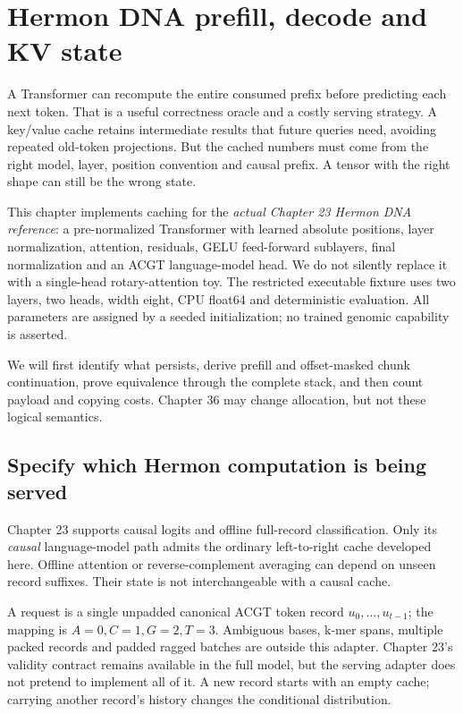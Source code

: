 \chapter{Hermon DNA prefill, decode and KV state}
\label{evod35:chapter}

A Transformer can recompute the entire consumed prefix before predicting
each next token. That is a useful correctness oracle and a costly serving
strategy. A key/value cache retains intermediate results that future queries
need, avoiding repeated old-token projections. But the cached numbers must
come from the right model, layer, position convention and causal prefix.
A tensor with the right shape can still be the wrong state.

This chapter implements caching for the \emph{actual Chapter 23 Hermon DNA
reference}: a pre-normalized Transformer with learned
absolute positions, layer normalization, attention, residuals, GELU
feed-forward sublayers, final normalization and an ACGT language-model head.
We do not silently replace it with a single-head rotary-attention toy.
The restricted executable fixture uses two layers, two heads, width eight,
CPU float64 and deterministic evaluation. All parameters are assigned by a
seeded initialization; no trained genomic capability is asserted.

We will first identify what persists, derive prefill and offset-masked chunk
continuation, prove equivalence through the complete stack, and then count
payload and copying costs. Chapter 36 may change allocation, but not these
logical semantics.

\section{Specify which Hermon computation is being served}
\label{evod35:scope}
Chapter 23 supports causal logits and offline full-record classification.
Only its \emph{causal} language-model path admits the ordinary left-to-right
cache developed here. Offline attention or reverse-complement averaging can
depend on unseen record suffixes. Their state is not interchangeable with a
causal cache.

A request is a single unpadded canonical ACGT token record
$u_0,\ldots,u_{t-1}$; the mapping is $A=0,C=1,G=2,T=3$.
Ambiguous bases, k-mer spans, multiple packed records and padded ragged batches
are outside this adapter. Chapter 23's validity contract remains available
in the full model, but the serving adapter does not pretend to implement all
of it. A new record starts with an empty cache; carrying another record's
history changes the conditional distribution.

